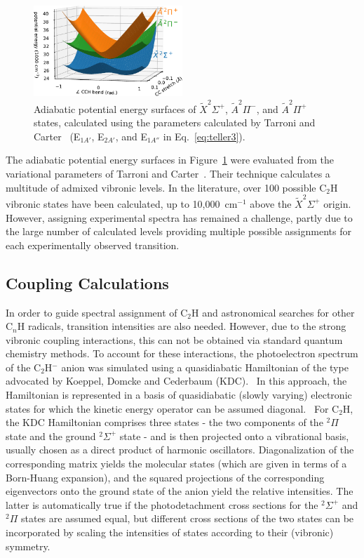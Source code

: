 \documentclass[journal=jpcafh,manuscript=article,layout=onecolumn, 12pt]{achemso}
\begin{document}
\begin{figure}
	\centering
	\includegraphics[width=0.5\textwidth]{figures/Fig3}
	\caption{Adiabatic potential energy surfaces of $\tilde{X}^2\Sigma^+$, $\tilde{A}^2\Pi^-$, and $\tilde{A}^2\Pi^+$ states, calculated using the parameters calculated by Tarroni and Carter~\cite{tar03} (E$_{1A'}$, E$_{2A'}$, and E$_{1A''}$ in Eq.~\ref{eq:teller3}).}
	\label{fig:2}
\end{figure}

The adiabatic potential energy surfaces in Figure~\ref{fig:2} were evaluated from the variational parameters of Tarroni and Carter~\cite{car00}. Their technique calculates a multitude of admixed vibronic levels. In the literature, over 100 possible C$_2$H vibronic states have been calculated, up to 10,000~cm$^{-1}$ above the $\tilde{X} ^2\Sigma^+$ origin. However, assigning experimental spectra has remained a challenge, partly due to the large number of calculated levels providing multiple possible assignments for each experimentally observed transition.


\subsection{Coupling Calculations}
In order to guide spectral assignment of C$_2$H and astronomical searches for other C$_n$H radicals, transition intensities are also needed. However, due to the strong vibronic coupling interactions, this can not be obtained via standard quantum chemistry methods. To account for these interactions, the photoelectron spectrum of the C$_2$H$^-$ anion was simulated using a quasidiabatic Hamiltonian of the type advocated by Koeppel, Domcke and Cederbaum (KDC).~\cite{kou84,dom81} In this approach, the Hamiltonian is represented in a basis of quasidiabatic (slowly varying) electronic  states for which the kinetic energy operator can be assumed diagonal.~\cite{pac93} For C$_2$H, the KDC Hamiltonian comprises three states - the two components of the $^2\Pi$ state and the ground $^2\Sigma^+$ state - and is then projected onto a vibrational basis, usually chosen as a direct product of harmonic oscillators. Diagonalization of the corresponding matrix yields the molecular states (which are given in terms of a Born-Huang expansion), and the squared projections of the corresponding eigenvectors onto the ground state of the anion yield the relative intensities. The latter is automatically true if the photodetachment cross sections for the $^2\Sigma^+$ and $^2\Pi$ states are assumed equal, but different cross sections of the two states can be incorporated by scaling the intensities of states according to their (vibronic) symmetry.~\cite{sta11} 
\end{document}

